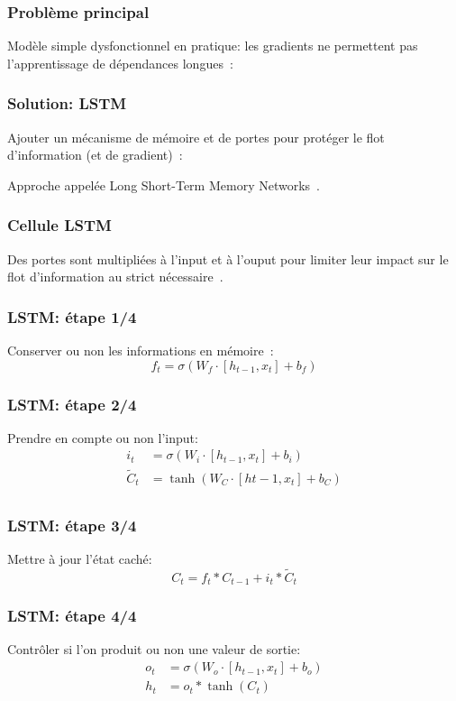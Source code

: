 \documentclass{formation}
\begin{document}
\begin{frame}
  \frametitle{Problème principal}

  Modèle simple dysfonctionnel en pratique: les gradients ne
  permettent pas l'apprentissage de dépendances
  longues~\cite{Bengio1994}:


\end{frame}

\begin{frame}
  \frametitle{Solution: LSTM}

  Ajouter un mécanisme de mémoire et de portes pour protéger le flot
  d'information (et de gradient)~\cite{Graves2013}:


  Approche appelée Long Short-Term Memory
  Networks~\cite{Hochreiter1997}.
\end{frame}

\begin{frame}
  \frametitle{Cellule LSTM}
   Des portes sont multipliées à l'input et à
  l'ouput pour limiter leur impact sur le flot d'information au strict
  nécessaire~\cite{Olaha}.
\end{frame}

\begin{frame}
  \frametitle{LSTM: étape 1/4}
  Conserver ou non les informations en mémoire~\cite{Gers1999}:
  \[
    f_t = \sigma(W_f \cdot [h_{t-1}, x_t] + b_f)
  \]
\end{frame}

\begin{frame}
  \frametitle{LSTM: étape 2/4}
  Prendre en compte ou non l'input:
    \begin{align*}
    i_t & = \sigma\left(W_i \cdot [h_{t-1}, x_t] + b_i\right) \\
    \tilde{C}_t & = \tanh\left(W_C \cdot [h{t-1}, x_t] + b_C\right) \\
    \end{align*}
\end{frame}

\begin{frame}
  \frametitle{LSTM: étape 3/4}
  Mettre à jour l'état caché:
  \[
    C_t = f_t * C_{t-1} + i_t * \tilde{C}_t
  \]
\end{frame}

\begin{frame}
  \frametitle{LSTM: étape 4/4}
  Contrôler si l'on produit ou non une valeur de sortie:
  \begin{align*}
    o_t & = \sigma(W_o\cdot [h_{t-1}, x_t] + b_o) \\
    h_t & = o_t * \tanh(C_t) \\    
  \end{align*}
\end{frame}
\end{document}
